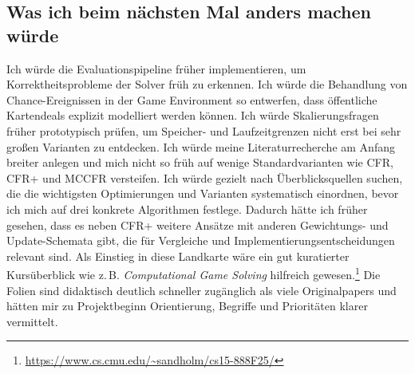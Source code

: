 \subsection{Was ich beim nächsten Mal anders machen würde}
Ich würde die Evaluationspipeline früher implementieren, um Korrektheitsprobleme der Solver früh zu erkennen.
Ich würde die Behandlung von Chance-Ereignissen in der Game Environment so entwerfen, dass öffentliche Kartendeals explizit modelliert werden können.
Ich würde Skalierungsfragen früher prototypisch prüfen, um Speicher- und Laufzeitgrenzen nicht erst bei sehr großen Varianten zu entdecken.
Ich würde meine Literaturrecherche am Anfang breiter anlegen und mich nicht so früh auf wenige Standardvarianten wie CFR, CFR+ und MCCFR versteifen.
Ich würde gezielt nach Überblicksquellen suchen, die die wichtigsten Optimierungen und Varianten systematisch einordnen, bevor ich mich auf drei konkrete Algorithmen festlege.
Dadurch hätte ich früher gesehen, dass es neben CFR+ weitere Ansätze mit anderen Gewichtungs- und Update-Schemata gibt, die für Vergleiche und Implementierungsentscheidungen relevant sind.
Als Einstieg in diese \glqq Landkarte\grqq{} wäre ein gut kuratierter Kursüberblick wie z.\,B. \emph{Computational Game Solving} hilfreich gewesen.\footnote{\url{https://www.cs.cmu.edu/~sandholm/cs15-888F25/}}
Die Folien sind didaktisch deutlich schneller zugänglich als viele Originalpapers und hätten mir zu Projektbeginn Orientierung, Begriffe und Prioritäten klarer vermittelt.

